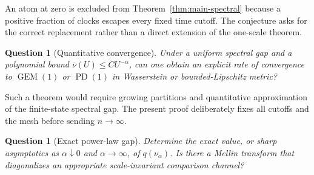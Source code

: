 \documentclass[11pt]{article}
\newtheorem{question}[theorem]{Question}
\theoremstyle{definition}
\theoremstyle{remark}
\newcommand{\PD}{\operatorname{PD}}
\newcommand{\GEM}{\operatorname{GEM}}
\begin{document}
An atom at zero is excluded from Theorem~\ref{thm:main-spectral} because a
positive fraction of clocks escapes every fixed time cutoff.  The conjecture
asks for the correct replacement rather than a direct extension of the
one-scale theorem.

\begin{question}[Quantitative convergence]
\label{q:quantitative}
Under a uniform spectral gap and a polynomial bound
$\overline\nu(U)\le CU^{-\alpha}$, can one obtain an explicit rate of
convergence to $\GEM(1)$ or $\PD(1)$ in Wasserstein or bounded-Lipschitz
metric?
\end{question}

Such a theorem would require growing partitions and quantitative approximation
of the finite-state spectral gap.  The present proof deliberately fixes all
cutoffs and the mesh before sending $n\to\infty$.

\begin{question}[Exact power-law gap]
\label{q:exact-gap}
Determine the exact value, or sharp asymptotics as $\alpha\downarrow0$ and
$\alpha\to\infty$, of $q(\nu_\alpha)$.  Is there a Mellin transform that
diagonalizes an appropriate scale-invariant comparison channel?
\end{question}
\end{document}
